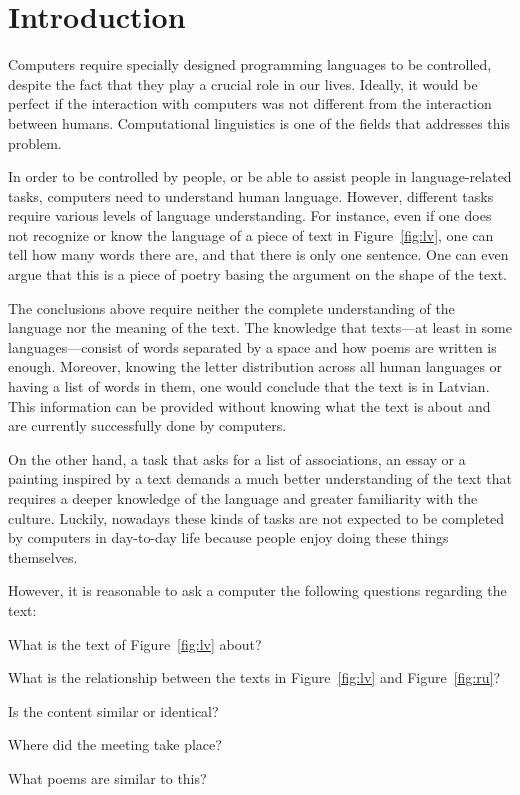 \chapter{Introduction}
\label{ch:introduction}


Computers require specially designed programming languages to be controlled, despite the fact that they play a crucial role in our lives. Ideally, it would be perfect if the interaction with computers was not different from the interaction between humans. Computational linguistics is one of the fields that addresses this problem.

In order to be controlled by people, or be able to assist people in
language-related tasks, computers need to understand human language. However,
different tasks require various levels of language understanding. For instance,
even if one does not recognize or know the language of a piece of text in
Figure~\ref{fig:lv}, one can tell how many words there are, and that there is
only one sentence. One can even argue that this is a piece of poetry basing the
argument on the shape of the text.

The conclusions above require neither the complete understanding of the language nor the meaning of the text. The knowledge that texts---at least in some languages---consist of words separated by a space and how poems are written is enough. Moreover, knowing the letter distribution across all human languages or having a list of words in them, one would conclude that the text is in Latvian. This information can be provided without knowing what the text is about and are currently successfully done by computers.



On the other hand, a task that asks for a list of associations, an essay or a painting inspired by a text demands a much better understanding of the text that requires a deeper knowledge of the language and greater familiarity with the culture. Luckily, nowadays these kinds of tasks are not expected to be completed by computers in day-to-day life because people enjoy doing these things themselves.

However, it is reasonable to ask a computer the following questions regarding the text:
\begin{inparaenum}[a)]
\item What is the text of Figure~\ref{fig:lv} about?
\item What is the relationship between the texts in Figure~\ref{fig:lv} and
  Figure~\ref{fig:ru}?
\item Is the content similar or identical?
\item Where did the meeting take place?
\item What poems are similar to this?
\end{inparaenum}

